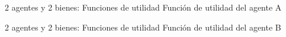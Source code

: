 \begin{frame}{2 agentes y 2 bienes: Funciones de utilidad}
		Función de utilidad del agente A\\
			\vspace{0.5cm}
		\centering
			
\end{frame}
\begin{frame}{2 agentes y 2 bienes: Funciones de utilidad}
	Función de utilidad del agente B\\
		\vspace{3.5cm}
	\hspace{-0.5cm} 
\end{frame}